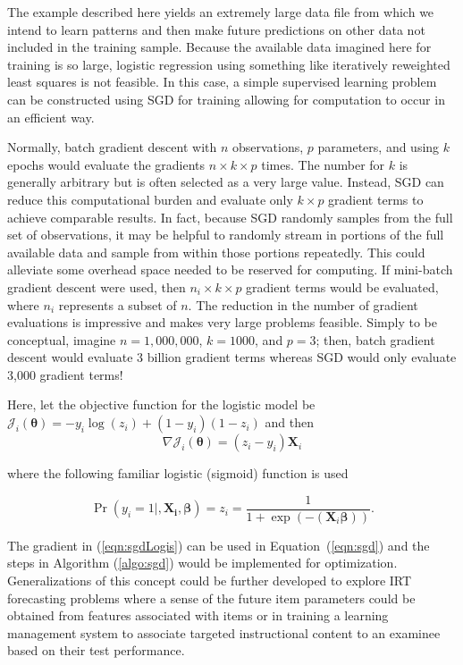 \documentclass[12pt]{article}
\begin{document}
The example described here yields an extremely large data file from which we intend to learn patterns and then make future predictions on other data not included in the training sample. Because the available data imagined here for training is so large, logistic regression using something like iteratively reweighted least squares is not feasible. In this case, a simple supervised learning problem can be constructed using SGD for training allowing for computation to occur in an efficient way. 

Normally, batch gradient descent with $n$ observations, $p$ parameters, and using $k$ epochs would evaluate the gradients $n \times k \times p$ times. The number for $k$ is generally arbitrary but is often selected as a very large value. Instead, SGD can reduce this computational burden and evaluate only $k \times p$ gradient terms to achieve comparable results. In fact, because SGD randomly samples from the full set of observations, it may be helpful to randomly stream in portions of the full available data and sample from within those portions repeatedly. This could alleviate some overhead space needed to be reserved for computing. If mini-batch gradient descent were used, then $n_i \times k \times p$ gradient terms would be evaluated, where $n_i$ represents a subset of $n$. The reduction in the number of gradient evaluations is impressive and makes very large problems feasible. Simply to be conceptual, imagine $n=1,000,000$, $k=1000$, and $p=3$; then, batch gradient descent would evaluate 3 billion gradient terms whereas SGD would only evaluate 3,000 gradient terms!

Here, let the objective function for the logistic model be $\mathcal{J}_i(\bm{\theta}) = -y_i\log(z_i) + (1 - y_i)(1-z_i)$ and then 
\begin{equation}
\label{eqn:sgdLogis}
\nabla\mathcal{J}_i(\bm{\theta}) = (z_i - y_i)\bm{X}_i
\end{equation}

\noindent where the following familiar logistic (sigmoid) function is used

\begin{equation}
\Pr(y_i=1|,\bm{\bm{X}_i,\beta}) = z_i = \frac{1}{1 + \exp(-(\bm{X}_i\bm{\beta}))}.
\end{equation}

The gradient in (\ref{eqn:sgdLogis}) can be used in Equation~(\ref{eqn:sgd}) and the steps in Algorithm (\ref{algo:sgd}) would be implemented for optimization. Generalizations of this concept could be further developed to explore IRT forecasting problems where a sense of the future item parameters could be obtained from features associated with items or in training a learning management system to associate targeted instructional content to an examinee based on their test performance.   
\end{document}
